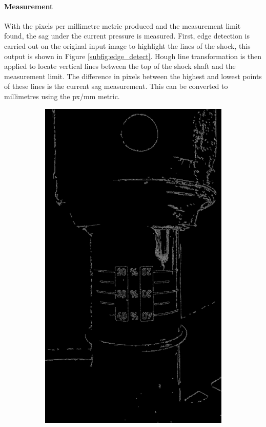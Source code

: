 		\paragraph{Measurement}
			With the pixels per millimetre metric produced and the measurement limit found, the sag under the current pressure is measured. First, edge detection is carried out on the original input image to highlight the lines of the shock, this output is shown in Figure \ref{subfig:edge_detect}. Hough line transformation is then applied to locate vertical lines between the top of the shock shaft and the measurement limit. The difference in pixels between the highest and lowest points of these lines is the current sag measurement. This can be converted to millimetres using the px/mm metric.
			\begin{figure}[h!]
				\centering
				\begin{subfigure}[t]{0.4\textwidth}
					\centering
					\includegraphics[scale=0.04]{../images/results/edged.jpg}

\end{subfigure}
\end{figure}
